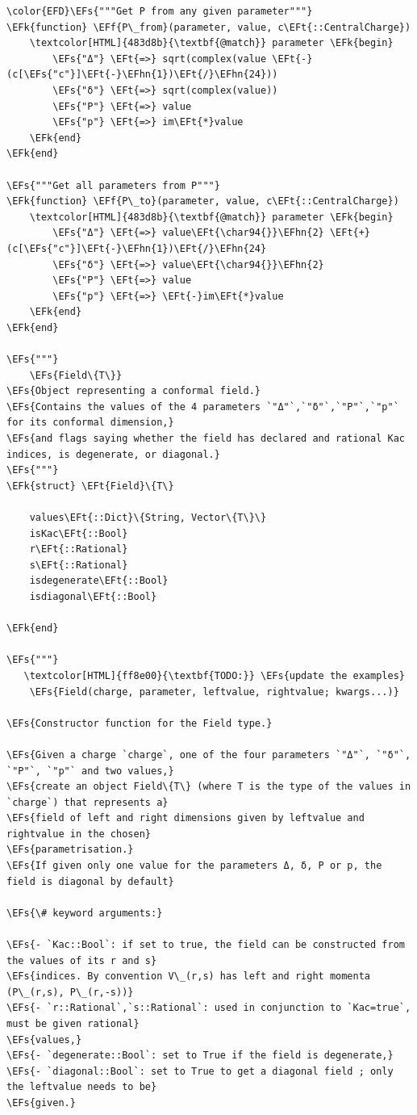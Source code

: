 \documentclass[a4paper]{article}
\numberwithin{equation}{section}
\newcommand{\EFs}[1]{\textcolor{EFs}{#1}} %
\newcommand{\EFk}[1]{\textcolor{EFk}{#1}} %
\newcommand{\EFf}[1]{\textcolor{EFf}{#1}} %
\newcommand{\EFt}[1]{\textcolor{EFt}{#1}} %
\newcommand{\EFhn}[1]{\textcolor{EFhn}{#1}} %
\begin{document}
\begin{Code}
\begin{Verbatim}
\color{EFD}\EFs{"""Get P from any given parameter"""}
\EFk{function} \EFf{P\_from}(parameter, value, c\EFt{::CentralCharge})
    \textcolor[HTML]{483d8b}{\textbf{@match}} parameter \EFk{begin}
        \EFs{"Δ"} \EFt{=>} sqrt(complex(value \EFt{-} (c[\EFs{"c"}]\EFt{-}\EFhn{1})\EFt{/}\EFhn{24}))
        \EFs{"δ"} \EFt{=>} sqrt(complex(value))
        \EFs{"P"} \EFt{=>} value
        \EFs{"p"} \EFt{=>} im\EFt{*}value
    \EFk{end}
\EFk{end}

\EFs{"""Get all parameters from P"""}
\EFk{function} \EFf{P\_to}(parameter, value, c\EFt{::CentralCharge})
    \textcolor[HTML]{483d8b}{\textbf{@match}} parameter \EFk{begin}
        \EFs{"Δ"} \EFt{=>} value\EFt{\char94{}}\EFhn{2} \EFt{+} (c[\EFs{"c"}]\EFt{-}\EFhn{1})\EFt{/}\EFhn{24}
        \EFs{"δ"} \EFt{=>} value\EFt{\char94{}}\EFhn{2}
        \EFs{"P"} \EFt{=>} value
        \EFs{"p"} \EFt{=>} \EFt{-}im\EFt{*}value
    \EFk{end}
\EFk{end}

\EFs{"""}
    \EFs{Field\{T\}}
\EFs{Object representing a conformal field.}
\EFs{Contains the values of the 4 parameters `"Δ"`,`"δ"`,`"P"`,`"p"` for its conformal dimension,}
\EFs{and flags saying whether the field has declared and rational Kac indices, is degenerate, or diagonal.}
\EFs{"""}
\EFk{struct} \EFt{Field}\{T\}

    values\EFt{::Dict}\{String, Vector\{T\}\}
    isKac\EFt{::Bool}
    r\EFt{::Rational}
    s\EFt{::Rational}
    isdegenerate\EFt{::Bool}
    isdiagonal\EFt{::Bool}

\EFk{end}

\EFs{"""}
   \textcolor[HTML]{ff8e00}{\textbf{TODO:}} \EFs{update the examples}
    \EFs{Field(charge, parameter, leftvalue, rightvalue; kwargs...)}

\EFs{Constructor function for the Field type.}

\EFs{Given a charge `charge`, one of the four parameters `"Δ"`, `"δ"`, `"P"`, `"p"` and two values,}
\EFs{create an object Field\{T\} (where T is the type of the values in `charge`) that represents a}
\EFs{field of left and right dimensions given by leftvalue and rightvalue in the chosen}
\EFs{parametrisation.}
\EFs{If given only one value for the parameters Δ, δ, P or p, the field is diagonal by default}

\EFs{\# keyword arguments:}

\EFs{- `Kac::Bool`: if set to true, the field can be constructed from the values of its r and s}
\EFs{indices. By convention V\_(r,s) has left and right momenta (P\_(r,s), P\_(r,-s))}
\EFs{- `r::Rational`,`s::Rational`: used in conjunction to `Kac=true`, must be given rational}
\EFs{values,}
\EFs{- `degenerate::Bool`: set to True if the field is degenerate,}
\EFs{- `diagonal::Bool`: set to True to get a diagonal field ; only the leftvalue needs to be}
\EFs{given.}


\end{Verbatim}
\end{Code}
\end{document}
